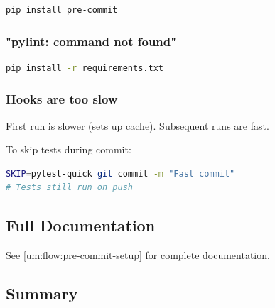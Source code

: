 \begin{record}

\begin{lstlisting}[language=bash]
pip install pre-commit
\end{lstlisting}

\end{record}

\subsubsection{"pylint: command not found"}\label{cr:app:archive-quickstart-precommit:pylint-command-not-found}

\begin{record}

\begin{lstlisting}[language=bash]
pip install -r requirements.txt
\end{lstlisting}

\end{record}

\subsubsection{Hooks are too slow}\label{cr:app:archive-quickstart-precommit:hooks-are-too-slow}

\begin{record}

First run is slower (sets up cache). Subsequent runs are fast.

To skip tests during commit:

\begin{lstlisting}[language=bash]
SKIP=pytest-quick git commit -m "Fast commit"
# Tests still run on push
\end{lstlisting}

\end{record}

\subsection{Full Documentation}\label{cr:app:archive-quickstart-precommit:full-documentation}

\begin{record}

See \cref{um:flow:pre-commit-setup} for complete documentation.

\end{record}

\subsection{Summary}\label{cr:app:archive-quickstart-precommit:summary}

